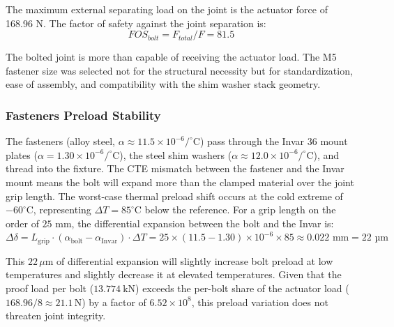 \documentclass[12pt, letterpaper]{report}%
\newcounter{mycounter}           %
\newcounter{sub}[mycounter]      %
\begin{document}
        The maximum external separating load on the joint is the actuator force of 168.96 N. The factor of safety against the joint separation is:
        \[ FOS_{bolt} = F_{total} / F = 81.5 \]
        
        The bolted joint is more than capable of receiving the actuator load. The M5 fastener size was selected not for the structural necessity but for standardization, ease of assembly, and compatibility with the shim washer stack geometry.

        \subsubsection{Fasteners Preload Stability}
        The fasteners (alloy steel, \( \alpha \approx 11.5 \times 10^{-6} /^\circ\text{C} \)) pass through the Invar 36 mount plates (\( \alpha = 1.30 \times 10^{-6} /^\circ\text{C} \)), 
        the steel shim washers (\( \alpha \approx 12.0 \times 10^{-6} /^\circ\text{C} \)), and thread into the fixture. The CTE mismatch between the fastener and the Invar mount means the bolt will expand more than the clamped material over the joint grip length. 
        The worst-case thermal preload shift occurs at the cold extreme of \( -60^\circ\text{C} \), representing \( \Delta T = 85^\circ\text{C} \) below the reference. For a grip length on the order of \( 25 \text{ mm} \), the differential expansion between the bolt and the Invar is:
        \(\Delta\delta = L_{\text{grip}} \cdot (\alpha_{\text{bolt}} - \alpha_{\text{Invar}}) \cdot \Delta T = 25 \times (11.5 - 1.30) \times 10^{-6} \times 85 \approx 0.022 \text{ mm} = 22 \text{ µm}\)

        This $22 \, \mu\text{m}$ of differential expansion will slightly increase bolt preload at low temperatures and slightly decrease it at elevated temperatures. 
        Given that the proof load per bolt ($13.774 \ \text{kN}$) exceeds the per-bolt share of the actuator load ($168.96 / 8 \approx 21.1 \, \text{N}$) by a factor of $6.52 \times 10^8$, this preload variation does not threaten joint integrity. 




        
\end{document}
